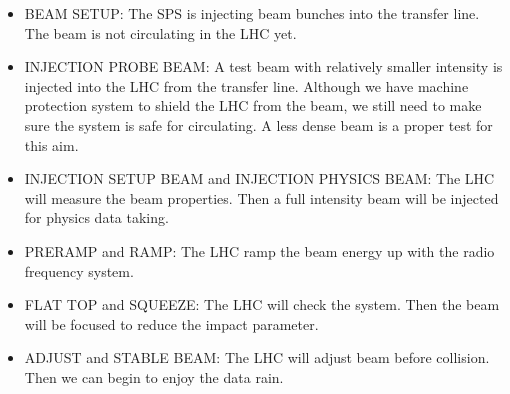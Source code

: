 \begin{itemize}
\item BEAM SETUP: The SPS is injecting beam bunches into the transfer line. The beam is not circulating in the LHC yet.
\item INJECTION PROBE BEAM: A test beam with relatively smaller intensity is injected into the LHC from the transfer line. Although we have machine protection system to shield the LHC from the beam, we still need to make sure the system is safe for circulating. A less dense beam is a proper test for this aim.
\item INJECTION SETUP BEAM and INJECTION PHYSICS BEAM: The LHC will measure the beam properties. Then a full intensity beam will be injected for physics data taking.
\item PRERAMP and RAMP: The LHC ramp the beam energy up with the radio frequency system.
\item FLAT TOP and SQUEEZE: The LHC will check the system. Then the beam will be focused to reduce the impact parameter.
\item ADJUST and STABLE BEAM: The LHC will adjust beam before collision. Then we can begin to enjoy the data rain.
\end{itemize}

